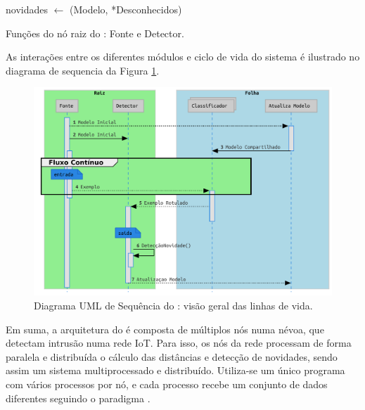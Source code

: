 \begin{algorithm}[htb]
{{{{                    novidades $\leftarrow$ \NoveltyDetection(Modelo, *Desconhecidos)\;
                }
            }
        }
    }
\caption{Funções do nó raiz do \mfog: Fonte e Detector.}
\label{alg:MFOG-root}
\end{algorithm}

As interações entre os diferentes módulos e ciclo de vida do sistema é ilustrado
no diagrama de sequencia da Figura \ref{fig:mfog-mpi-life}.

\begin{figure}[htb]
  \centerline{
    \includegraphics[width=0.9\linewidth,page=1]{figures/lifecycle-uml-svg.pdf}
  }
  \caption{Diagrama UML de Sequência do \mfog: visão geral das linhas de vida.}
  \label{fig:mfog-mpi-life}
\end{figure}

Em suma, a arquitetura do \mfog é composta de múltiplos nós numa névoa, que detectam
intrusão numa rede IoT. Para isso, os nós da rede processam de forma paralela e
distribuída o cálculo das distâncias e detecção de novidades, sendo assim um
sistema multiprocessado e distribuído. Utiliza-se um único programa com vários
processos por nó, e cada processo recebe um conjunto de dados diferentes
seguindo o paradigma \spmd.
